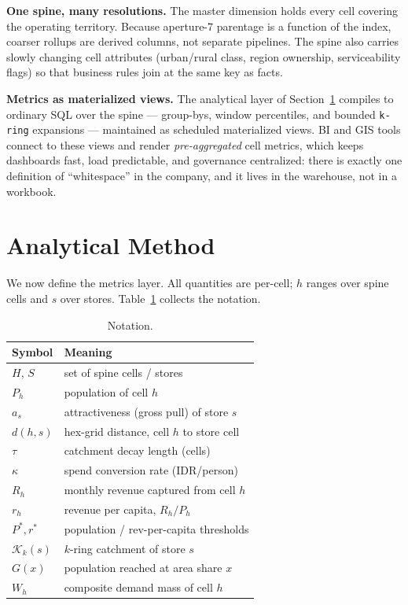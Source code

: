 \documentclass[11pt,a4paper,twocolumn]{article}
\begin{document}
\textbf{One spine, many resolutions.} The master dimension holds every
cell covering the operating territory. Because aperture-7 parentage is a
function of the index, coarser rollups are derived columns, not separate
pipelines. The spine also carries slowly changing cell attributes
(urban/rural class, region ownership, serviceability flags) so that
business rules join at the same key as facts.

\textbf{Metrics as materialized views.} The analytical layer of
Section~\ref{sec:method} compiles to ordinary SQL over the spine ---
group-bys, window percentiles, and bounded \texttt{k-ring} expansions ---
maintained as scheduled materialized views. BI and GIS tools connect to
these views and render \emph{pre-aggregated} cell metrics, which keeps
dashboards fast, load predictable, and governance centralized: there is
exactly one definition of ``whitespace'' in the company, and it lives in
the warehouse, not in a workbook.

\section{Analytical Method}
\label{sec:method}

We now define the metrics layer. All quantities are per-cell; $h$ ranges
over spine cells and $s$ over stores. Table~\ref{tab:notation} collects
the notation.

\begin{table}[t]
  \centering
  \small
  \caption{Notation.}
  \label{tab:notation}
  \begin{tabular}{@{}ll@{}}
    \toprule
    \textbf{Symbol} & \textbf{Meaning} \\
    \midrule
    $H$, $S$ & set of spine cells / stores \\
    $P_h$ & population of cell $h$ \\
    $a_s$ & attractiveness (gross pull) of store $s$ \\
    $d(h,s)$ & hex-grid distance, cell $h$ to store cell \\
    $\tau$ & catchment decay length (cells) \\
    $\kappa$ & spend conversion rate (IDR/person) \\
    $R_h$ & monthly revenue captured from cell $h$ \\
    $r_h$ & revenue per capita, $R_h / P_h$ \\
    $P^{*}, r^{*}$ & population / rev-per-capita thresholds \\
    $\mathcal{K}_k(s)$ & $k$-ring catchment of store $s$ \\
    $G(x)$ & population reached at area share $x$ \\
    $W_h$ & composite demand mass of cell $h$ \\
    \bottomrule
  \end{tabular}
\end{table}
\end{document}
